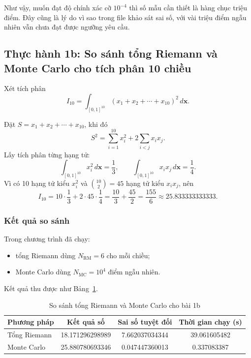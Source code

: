 \documentclass{article}
\begin{document}
Như vậy, muốn đạt độ chính xác cỡ $10^{-4}$ thì số mẫu cần thiết là hàng chục triệu điểm. Đây cũng là lý do vì sao trong file khảo sát sai số, với vài triệu điểm ngẫu nhiên vẫn chưa đạt được ngưỡng yêu cầu.

\subsection{Thực hành 1b: So sánh tổng Riemann và Monte Carlo cho tích phân 10 chiều}

Xét tích phân
\[
I_{10} = \int_{[0,1]^{10}} (x_1+x_2+\cdots+x_{10})^2\,d\mathbf{x}.
\]

Đặt $S = x_1 + x_2 + \cdots + x_{10}$, khi đó
\[
S^2 = \sum_{i=1}^{10} x_i^2 + 2\sum_{i<j} x_i x_j.
\]
Lấy tích phân từng hạng tử:
\[
\int_{[0,1]^{10}} x_i^2\,d\mathbf{x} = \frac{1}{3},
\qquad
\int_{[0,1]^{10}} x_i x_j\,d\mathbf{x} = \frac{1}{4}.
\]
Vì có 10 hạng tử kiểu $x_i^2$ và $\binom{10}{2}=45$ hạng tử kiểu $x_i x_j$, nên
\[
I_{10} = 10\cdot\frac{1}{3} + 2\cdot 45\cdot \frac{1}{4}
= \frac{10}{3} + \frac{45}{2}
= \frac{155}{6} \approx 25.833333333333.
\]

\subsubsection{Kết quả so sánh}

Trong chương trình đã chạy:
\begin{itemize}
    \item tổng Riemann dùng $N_{\mathrm{RM}}=6$ cho mỗi chiều;
    \item Monte Carlo dùng $N_{\mathrm{MC}}=10^4$ điểm ngẫu nhiên.
\end{itemize}

Kết quả thu được như Bảng~\ref{tab:mc1b}.

\begin{table}[H]
\centering
\caption{So sánh tổng Riemann và Monte Carlo cho bài 1b}
\label{tab:mc1b}
\begin{tabular}{lccc}
\toprule
Phương pháp & Kết quả số & Sai số tuyệt đối & Thời gian chạy (s) \\
\midrule
Tổng Riemann & 18.171296298989 & 7.662037034344 & 39.061605482 \\
Monte Carlo & 25.880780693346 & 0.047447360013 & 0.337083387 \\
\bottomrule
\end{tabular}
\end{table}
\end{document}
